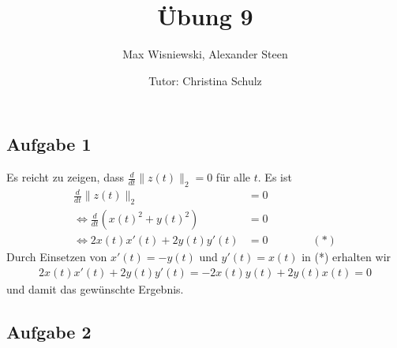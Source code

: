 \documentclass[11pt,a4paper,ngerman]{article}
\date{Tutor: Christina Schulz}
\title{Übung 9}
\author{Max Wisniewski, Alexander Steen}
\begin{document}

\renewcommand{\figurename}{Figure}

\maketitle
\thispagestyle{fancy}

\subsection*{Aufgabe 1}
Es reicht zu zeigen, dass $\frac{d}{dt} \|z(t) \|_2 = 0$ für alle $t$. Es ist
\begin{equation*}\begin{split}
\frac{d}{dt} \|z(t) \|_2 &= 0 \\
\Leftrightarrow  \frac{d}{dt} (x(t)^2 + y(t)^2) &= 0 \\
\Leftrightarrow 2 x(t) x'(t)+2 y(t) y'(t) &= 0 \qquad \qquad (*)
\end{split}\end{equation*}
Durch Einsetzen von $x'(t) = -y(t)$ und $y'(t) = x(t)$ in (*) erhalten wir
\begin{equation*}\begin{split}
 2 x(t) x'(t)+2 y(t) y'(t) =  -2 x(t) y(t)+2 y(t)  x(t) = 0
\end{split}\end{equation*}
und damit das gewünschte Ergebnis.


\subsection*{Aufgabe 2}



\end{document}
